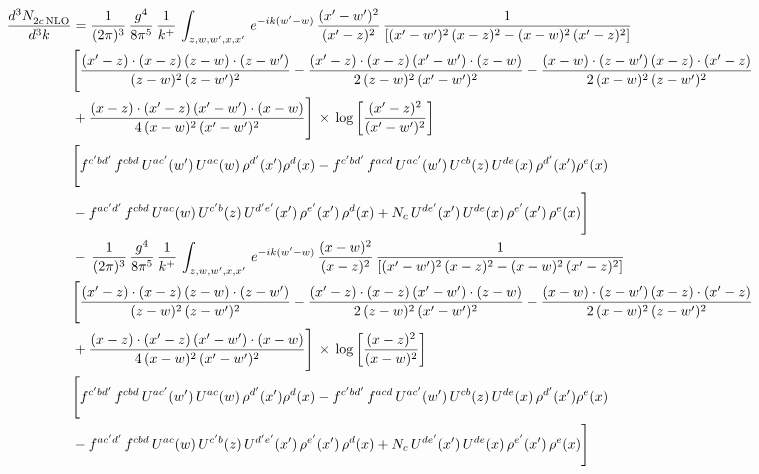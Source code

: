 \documentclass[9pt]{article}
\numberwithin{equation}{section}
\begin{document}
\begin{align}
    \frac{d^{3}N_{2c\,\rm NLO}^{\rm}}{d^{3}k}  & =  \frac{1}{(2\pi)^{3}}\, \frac{g^{4}}{8\pi^{5}}\,\frac{1}{k^{+}}\,\int_{z,w,w^{\prime},x,x'}\, e^{-ik(w^{\prime}-w)}\,\frac{(x'-w')^{2}}{(x'-z)^{2}}\, \frac{1}{\left[(x'-w')^{2}\, (x-z)^{2} - (x-w)^{2}\, (x'-z)^{2}\right]} \notag \\ & \Bigg[\frac{(x'-z)\cdot (x-z)\, (z-w)\cdot (z-w')}{(z-w)^{2}\, (z-w')^{2}}-\frac{(x'-z)\cdot (x-z)\, (x'-w')\cdot (z-w)}{2\, (z-w)^{2}\, (x'-w')^{2}} -\frac{(x-w)\cdot (z-w')\, (x-z)\cdot (x'-z)}{2\, (x-w)^{2}\, (z-w')^{2}}\notag \\ & +\frac{(x-z)\cdot (x'-z)\, (x'-w')\cdot (x-w)}{4\, (x-w)^{2}\, (x'-w')^{2}}\Bigg]\,\times\, \log{\left[\frac{(x'-z)^{2}}{(x'-w')^{2}}\right]} \notag \\ &  \Bigg[f^{c'bd'}\,f^{cbd}\, U^{ac'}(w')\,U^{ac}(w)\,\rho^{d'}(x')\rho^{d}(x)- f^{c'bd'}\,f^{acd}\,U^{ac'}(w')\,U^{cb}(z)\,U^{de}(x)\,\rho^{d'}(x')\rho^{e}(x) \notag \\ & -f^{ac'd'}\,f^{cbd}\,U^{ac}(w)\,U^{c'b}(z)\,U^{d'e'}(x')\,\rho^{e'}(x')\,\rho^{d}(x) +N_{c}\,U^{de'}(x')\,U^{de}(x)\,\rho^{e'}(x')\,\rho^{e}(x)\Bigg] \notag \\ & -\,\frac{1}{(2\pi)^{3}}\, \frac{g^{4}}{8\pi^{5}}\,\frac{1}{k^{+}}\,\int_{z,w,w^{\prime},x,x'}\, e^{-ik(w^{\prime}-w)}\,\frac{(x-w)^{2}}{(x-z)^{2}}\, \frac{1}{\left[(x'-w')^{2}\, (x-z)^{2} - (x-w)^{2}\, (x'-z)^{2}\right]} \notag \\ & \Bigg[\frac{(x'-z)\cdot (x-z)\, (z-w)\cdot (z-w')}{(z-w)^{2}\, (z-w')^{2}}-\frac{(x'-z)\cdot (x-z)\, (x'-w')\cdot (z-w)}{2\, (z-w)^{2}\, (x'-w')^{2}} -\frac{(x-w)\cdot (z-w')\, (x-z)\cdot (x'-z)}{2\, (x-w)^{2}\, (z-w')^{2}}\notag \\ & +\frac{(x-z)\cdot (x'-z)\, (x'-w')\cdot (x-w)}{4\, (x-w)^{2}\, (x'-w')^{2}}\Bigg]\,\times\, \log{\left[\frac{(x-z)^{2}}{(x-w)^{2}}\right]} \notag \\ &  \Bigg[f^{c'bd'}\,f^{cbd}\, U^{ac'}(w')\,U^{ac}(w)\,\rho^{d'}(x')\rho^{d}(x)- f^{c'bd'}\,f^{acd}\,U^{ac'}(w')\,U^{cb}(z)\,U^{de}(x)\,\rho^{d'}(x')\rho^{e}(x) \notag \\ & -f^{ac'd'}\,f^{cbd}\,U^{ac}(w)\,U^{c'b}(z)\,U^{d'e'}(x')\,\rho^{e'}(x')\,\rho^{d}(x) +N_{c}\,U^{de'}(x')\,U^{de}(x)\,\rho^{e'}(x')\,\rho^{e}(x)\Bigg]
\end{align}
\end{document}
